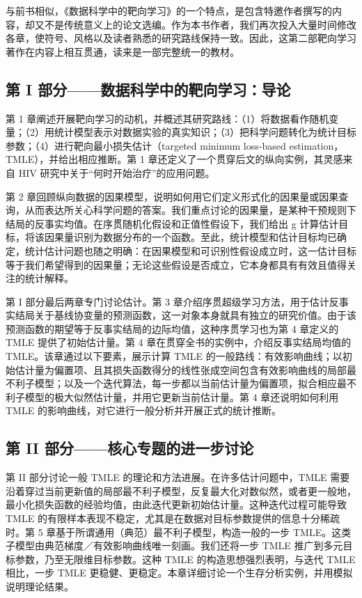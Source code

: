 与前书相似，《数据科学中的靶向学习》的一个特点，是包含特邀作者撰写的内容，却又不是传统意义上的论文选编。作为本书作者，我们再次投入大量时间修改各章，使符号、风格以及读者熟悉的研究路线保持一致。因此，这第二部靶向学习著作在内容上相互贯通，读来是一部完整统一的教材。

\subsection*{第 I 部分——数据科学中的靶向学习：导论}

第 1 章阐述开展靶向学习的动机，并概述其研究路线：（1）将数据看作随机变量；（2）用统计模型表示对数据实验的真实知识；（3）把科学问题转化为统计目标参数；（4）进行靶向最小损失估计（targeted minimum loss-based estimation，TMLE），并给出相应推断。第 1 章还定义了一个贯穿后文的纵向实例，其灵感来自 HIV 研究中关于“何时开始治疗”的应用问题。

第 2 章回顾纵向数据的因果模型，说明如何用它们定义形式化的因果量或因果查询，从而表达所关心科学问题的答案。我们重点讨论的因果量，是某种干预规则下结局的反事实均值。在序贯随机化假设和正值性假设下，我们给出 g 计算估计目标，将该因果量识别为数据分布的一个函数。至此，统计模型和估计目标均已确定，统计估计问题也随之明确：在因果模型和可识别性假设成立时，这一估计目标等于我们希望得到的因果量；无论这些假设是否成立，它本身都具有有效且值得关注的统计解释。

第 I 部分最后两章专门讨论估计。第 3 章介绍序贯超级学习方法，用于估计反事实结局关于基线协变量的预测函数，这一对象本身就具有独立的研究价值。由于该预测函数的期望等于反事实结局的边际均值，这种序贯学习也为第 4 章定义的 TMLE 提供了初始估计量。第 4 章在贯穿全书的实例中，介绍反事实结局均值的 TMLE。该章通过以下要素，展示计算 TMLE 的一般路线：有效影响曲线；以初始估计量为偏置项、且其损失函数得分的线性张成空间包含有效影响曲线的局部最不利子模型；以及一个迭代算法，每一步都以当前估计量为偏置项，拟合相应最不利子模型的极大似然估计量，并用它更新当前估计量。第 4 章还说明如何利用 TMLE 的影响曲线，对它进行一般分析并开展正式的统计推断。

\subsection*{第 II 部分——核心专题的进一步讨论}

第 II 部分讨论一般 TMLE 的理论和方法进展。在许多估计问题中，TMLE 需要沿着穿过当前更新值的局部最不利子模型，反复最大化对数似然，或者更一般地，最小化损失函数的经验均值，由此迭代更新初始估计量。这种迭代过程可能导致 TMLE 的有限样本表现不稳定，尤其是在数据对目标参数提供的信息十分稀疏时。第 5 章基于所谓通用（典范）最不利子模型，构造一般的一步 TMLE。这类子模型由典范梯度／有效影响曲线唯一刻画。我们还将一步 TMLE 推广到多元目标参数，乃至无限维目标参数。这种 TMLE 的构造思想强烈表明，与迭代 TMLE 相比，一步 TMLE 更稳健、更稳定。本章详细讨论一个生存分析实例，并用模拟说明理论结果。

